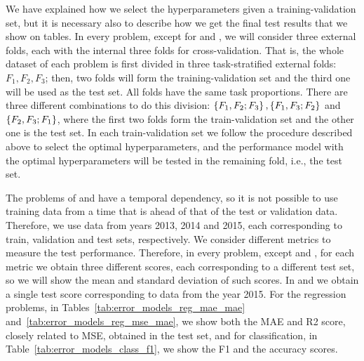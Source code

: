 We have explained how we select the hyperparameters given a training-validation set, but it is necessary also to describe how we get the final test results that we show on tables.
In every problem, except for  and , we will consider three external folds, each with the internal three folds for cross-validation. That is, the whole dataset of each problem is first divided in three task-stratified external folds: $F_1, F_
2, F_3$; then, two folds will form the training-validation set and the third one will be used as the test set. All folds have the same task proportions. There are three different combinations to do this division: $\left\{F_1, F_2; F_3\right\}, \left\{F_1, F_3; F_2\right\}$ and $\left\{F_2, F_3; F_1\right\}$, where the first two folds form the train-validation set and the other one is the test set.
%
In each train-validation set we follow the procedure described above to select the optimal hyperparameters, and the performance model with the optimal hyperparameters will be tested in the remaining fold, i.e., the test set.
%

The problems of  and  have a temporal dependency, so it is not possible to use training data from a time that is ahead of that of the test or validation data. Therefore, we use data from years 2013, 2014 and 2015, each corresponding to train, validation and test sets, respectively.
%
We consider different metrics to measure the test performance. Therefore, in every problem, except  and , for each metric we obtain three different scores, each corresponding to a different test set, so we will show the mean and standard deviation of such scores. In  and  we obtain a single test score corresponding to data from the year 2015.
% 
For the regression problems, in Tables~\ref{tab:error_models_reg_mae_mae} and~\ref{tab:error_models_reg_mse_mae}, we show both the MAE and R2 score, closely related to MSE, obtained in the test set, and for classification, in Table~\ref{tab:error_models_class_f1}, we show the F1 and the accuracy scores.
%






